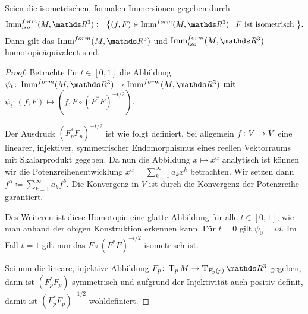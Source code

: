 \begin{Satz}\label{satz:immerformiso}
  Seien die isometrischen, formalen Immersionen gegeben durch
  \begin{gather*}
    \Immfi{M}{\R^3} \coloneqq \set{(f,F) \in \Immf{M}{\R^3}}{F \text{
        ist isometrisch }}.
  \end{gather*}
  Dann gilt das $\Immf{M}{\R^3}$ und $\Immfi{M}{\R^3}$
  homotopieäquivalent sind.
	\begin{proof}
          Betrachte für $t \in [0,1]$ die Abbildung
          $\abb{\psi_t}{\Immf{M}{\R^3}}{\Immf{M}{\R^3}}$ mit
          $\psi_t : (f,F) \mapsto (f,F \circ
          (F^{\ast}F)^{-t/2})$.
		
          Der Ausdruck $ (F_p^\ast F_p)^{-t/2} $ ist wie folgt
          definiert. Sei allgemein $ f \colon V \rightarrow V $ eine linearer, injektiver,
          symmetrischer Endomorphismus eines reellen Vektorraums mit
          Skalarprodukt gegeben. Da nun die Abbildung $ x\mapsto x^\alpha $ analytisch ist können wir die Potenzreihenentwicklung $ x^\alpha = \sum_{k=1}^{\infty} a_k x^k $ betrachten. Wir setzen dann $ f^\alpha \coloneqq \sum_{k=1}^{\infty} a_k f^k $. Die Konvergenz in $ V $ ist durch die Konvergenz der Potenzreihe garantiert.
		
          Des Weiteren ist diese Homotopie eine glatte Abbildung für alle
          $ t \in [0,1] $, wie man anhand der obigen Konstruktion erkennen kann. Für $ t=0 $ gilt $ \psi_0 = id $. Im Fall
          $ t=1 $ gilt nun das $ F \circ (F^{\ast}F)^{-t/2} $
          isometrisch ist.
		

		
          Sei nun die lineare, injektive Abbildung
          $ \abb{F_p}{\tang{p}{M}}{\tang{F_p(p)}{\R^3}} $ gegeben,
          dann ist $ (F_p^\ast F_p) $ symmetrisch und aufgrund der
          Injektivität auch positiv definit, damit ist
          $ (F_p^\ast F_p)^{-1/2} $ wohldefiniert.
		

\end{proof}
\end{Satz}
